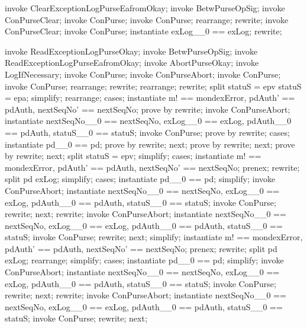 \begin{LPScript}\begin{zproof}[tClearExceptionLogPurseEafromOkayPRE]
    invoke ClearExceptionLogPurseEafromOkay;
    invoke BetwPurseOpSig;
    invoke \Xi ConPurseClear;
    invoke \Delta ConPurse;
    invoke ConPurse;
    rearrange;
    rewrite;
    invoke ConPurseClear;
    invoke ConPurse;
    instantiate exLog\_\_0 == exLog;
    rewrite;
\end{zproof}\end{LPScript}

\begin{LPScript}\begin{zproof}[tReadExceptionLogEafromOkayPRE]
    invoke ReadExceptionLogPurseOkay;
    invoke BetwPurseOpSig;
    invoke ReadExceptionLogPurseEafromOkay;
    invoke AbortPurseOkay;
    invoke LogIfNecessary;
    invoke \Xi ConPurse;
    invoke \Xi ConPurseAbort;
    invoke \Delta ConPurse;
    invoke ConPurse;
    rearrange;
    rewrite;
    rearrange;
    rewrite;
    split \lnot statuS = epv \land \lnot statuS = epa;
    simplify;
    rearrange;
    cases;
    instantiate m! == mondexError, pdAuth' == pdAuth, nextSeqNo' == nextSeqNo;
    prove by rewrite;
    invoke ConPurseAbort;
    instantiate
    nextSeqNo\_\_0 == nextSeqNo, exLog\_\_0 == exLog, pdAuth\_\_0 == pdAuth,
    statuS\_\_0 == statuS;
    invoke ConPurse;
    prove by rewrite;
    cases;
    instantiate pd\_\_0 == pd;
    prove by rewrite;
    next;
    prove by rewrite;
    next;
    prove by rewrite;
    next;
    split statuS = epv;
    simplify;
    cases;
    instantiate m! == mondexError, pdAuth' == pdAuth, nextSeqNo' == nextSeqNo;
    prenex;
    rewrite;
    split pd \in exLog;
    simplify;
    cases;
    instantiate pd\_\_0 == pd;
    simplify;
    invoke ConPurseAbort;
    instantiate nextSeqNo\_\_0 == nextSeqNo, exLog\_\_0 == exLog,
        pdAuth\_\_0 == pdAuth, statuS\_\_0 == statuS;
    invoke ConPurse;
    rewrite;
    next;
    rewrite;
    invoke ConPurseAbort;
    instantiate nextSeqNo\_\_0 == nextSeqNo, exLog\_\_0 == exLog,
        pdAuth\_\_0 == pdAuth, statuS\_\_0 == statuS;
    invoke ConPurse;
    rewrite;
    next;
    simplify;
    instantiate m! == mondexError, pdAuth' == pdAuth, nextSeqNo' == nextSeqNo;
    prenex;
    rewrite;
    split pd \in exLog;
    rearrange;
    simplify;
    cases;
    instantiate pd\_\_0 == pd;
    simplify;
    invoke ConPurseAbort;
    instantiate nextSeqNo\_\_0 == nextSeqNo, exLog\_\_0 == exLog,
        pdAuth\_\_0 == pdAuth, statuS\_\_0 == statuS;
    invoke ConPurse;
    rewrite;
    next;
    rewrite;
    invoke ConPurseAbort;
    instantiate nextSeqNo\_\_0 == nextSeqNo, exLog\_\_0 == exLog,
        pdAuth\_\_0 == pdAuth, statuS\_\_0 == statuS;
    invoke ConPurse;
    rewrite;
    next;
\end{zproof}\end{LPScript}

